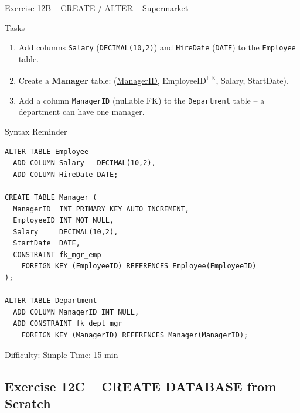 \documentclass[10pt]{beamer}
\begin{document}
\begin{frame}[fragile]{Exercise 12B -- CREATE / ALTER -- Supermarket}
  \begin{block}{Tasks}
    \begin{enumerate}
      \item Add columns \texttt{Salary} (\texttt{DECIMAL(10,2)}) and \texttt{HireDate} (\texttt{DATE}) to the \texttt{Employee} table.
      \item Create a \textbf{Manager} table: (\underline{ManagerID}, EmployeeID\textsuperscript{FK}, Salary, StartDate).
      \item Add a column \texttt{ManagerID} (nullable FK) to the \texttt{Department} table -- a department can have one manager.
    \end{enumerate}
  \end{block}

  \begin{block}{Syntax Reminder}
\begin{lstlisting}[style=sqlstyle]
ALTER TABLE Employee
  ADD COLUMN Salary   DECIMAL(10,2),
  ADD COLUMN HireDate DATE;

CREATE TABLE Manager (
  ManagerID  INT PRIMARY KEY AUTO_INCREMENT,
  EmployeeID INT NOT NULL,
  Salary     DECIMAL(10,2),
  StartDate  DATE,
  CONSTRAINT fk_mgr_emp
    FOREIGN KEY (EmployeeID) REFERENCES Employee(EmployeeID)
);

ALTER TABLE Department
  ADD COLUMN ManagerID INT NULL,
  ADD CONSTRAINT fk_dept_mgr
    FOREIGN KEY (ManagerID) REFERENCES Manager(ManagerID);
\end{lstlisting}
  \end{block}

  \begin{alertblock}{Difficulty: Simple \quad Time: 15 min}
  \end{alertblock}
\end{frame}

\subsection{Exercise 12C -- CREATE DATABASE from Scratch}
\end{document}
